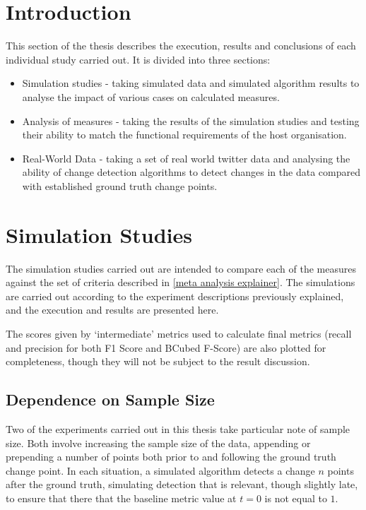 \documentclass{uvamscse}	%
\begin{document}
\section{Introduction}

This section of the thesis describes the execution, results and conclusions of each individual study carried out. It is divided into three sections:

\begin{itemize}
    \item Simulation studies - taking simulated data and simulated algorithm results to analyse the impact of various cases on calculated measures.
    \item Analysis of measures - taking the results of the simulation studies and testing their ability to match the functional requirements of the host organisation.
    \item Real-World Data - taking a set of real world twitter data and analysing the ability of change detection algorithms to detect changes in the data compared with established ground truth change points.
\end{itemize}

\section{Simulation Studies}

The simulation studies carried out are intended to compare each of the measures against the set of criteria described in \autoref{meta analysis explainer}. The simulations are carried out according to the experiment descriptions previously explained, and the execution and results are presented here.

The scores given by `intermediate' metrics used to calculate final metrics (recall and precision for both F1 Score and BCubed F-Score) are also plotted for completeness, though they will not be subject to the result discussion.

\subsection{Dependence on Sample Size}
\label{sample size dependence}

Two of the experiments carried out in this thesis take particular note of sample size. Both involve increasing the sample size of the data, appending or prepending a number of points both prior to and following the ground truth change point. In each situation, a simulated algorithm detects a change $n$ points after the ground truth, simulating detection that is relevant, though slightly late, to ensure that there that the baseline metric value at $t = 0$ is not equal to $1$.
\end{document}
